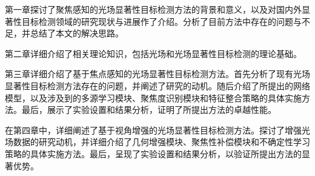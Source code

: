 

第一章探讨了聚焦感知的光场显著性目标检测方法的背景和意义，以及对国内外显著性目标检测领域的研究现状与进展作了介绍。分析了目前方法中存在的问题与不足，并总结了本文的解决思路。

第二章详细介绍了相关理论知识，包括光场和光场显著性目标检测的理论基础。

第三章详细介绍了基于焦点感知的光场显著性目标检测方法。首先分析了现有光场显著性目标检测方法存在的问题，并阐述了研究的动机。随后介绍了所提出的网络模型，以及涉及到的多源学习模块、聚焦度识别模块和特征整合策略的具体实施方法。最后，展示了实验设置和结果分析，证明了所提出方法的卓越性能。

在第四章中，详细阐述了基于视角增强的光场显著性目标检测方法。探讨了增强光场数据的研究动机，并详细介绍了几何增强模块、聚焦性补偿模块和不确定性学习策略的具体实施方法。最后，呈现了实验设置和结果分析，以验证所提出方法的显著优势。

